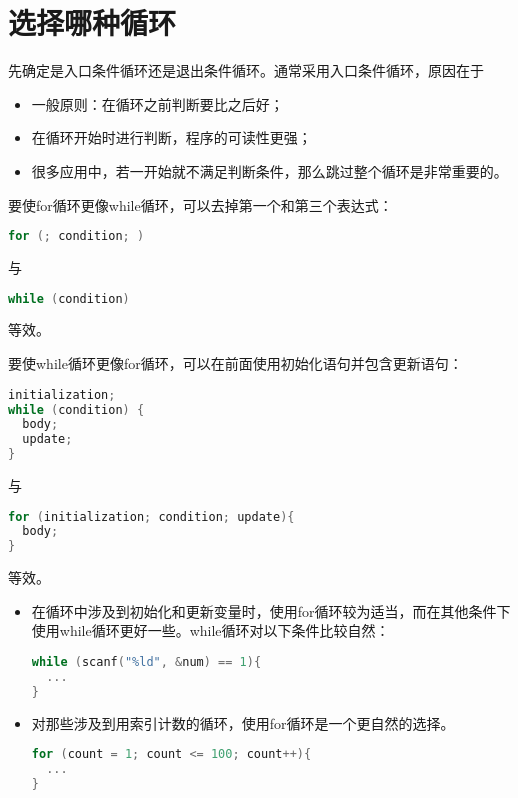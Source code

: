 \section{选择哪种循环}
\begin{frame}[fragile]\ft{\secname}
先确定是入口条件循环还是退出条件循环。通常采用入口条件循环，原因在于

\begin{itemize}
\item
一般原则：在循环之前判断要比之后好；\\[0.1in]
\item 
在循环开始时进行判断，程序的可读性更强；\\[0.1in]
\item
很多应用中，若一开始就不满足判断条件，那么跳过整个循环是非常重要的。
\end{itemize}
\end{frame}

\begin{frame}[fragile]\ft{\secname}
要使for循环更像while循环，可以去掉第一个和第三个表达式：
\begin{lstlisting}[language=c,frame=single]
for (; condition; )
\end{lstlisting}
与
\begin{lstlisting}[language=c,frame=single]
while (condition)
\end{lstlisting}
等效。
\end{frame}

\begin{frame}[fragile]\ft{\secname}
要使while循环更像for循环，可以在前面使用初始化语句并包含更新语句：
\begin{lstlisting}[language=c,frame=single]
initialization;
while (condition) {
  body;
  update;
}
\end{lstlisting}
与
\begin{lstlisting}[language=c,frame=single]
for (initialization; condition; update){
  body;
}
\end{lstlisting}
等效。
\end{frame}

\begin{frame}[fragile]\ft{\secname}
\begin{itemize}
\item 在循环中涉及到初始化和更新变量时，使用for循环较为适当，而在其他条件下使用while循环更好一些。while循环对以下条件比较自然：
\begin{lstlisting}[language=c,frame=single]
while (scanf("%ld", &num) == 1){
  ...
}
\end{lstlisting}

\item 对那些涉及到用索引计数的循环，使用for循环是一个更自然的选择。
\begin{lstlisting}[language=c,frame=single]
for (count = 1; count <= 100; count++){
  ...
}
\end{lstlisting}
\end{itemize}

\end{frame}

